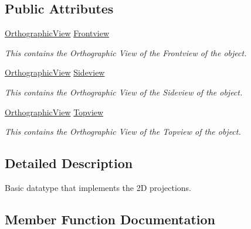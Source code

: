 \subsection*{Public Attributes}
\begin{DoxyCompactItemize}
\item 
\mbox{\label{class_file2_d_a3f1062d4c68eba7a225152bf63832d8b}} 
\mbox{\hyperlink{class_orthographic_view}{Orthographic\+View}} \mbox{\hyperlink{class_file2_d_a3f1062d4c68eba7a225152bf63832d8b}{Frontview}}
\begin{DoxyCompactList}\small\item\em This contains the Orthographic View of the Frontview of the object. \end{DoxyCompactList}\item 
\mbox{\label{class_file2_d_ad5bf89a1555c22903c084ec9692015d8}} 
\mbox{\hyperlink{class_orthographic_view}{Orthographic\+View}} \mbox{\hyperlink{class_file2_d_ad5bf89a1555c22903c084ec9692015d8}{Sideview}}
\begin{DoxyCompactList}\small\item\em This contains the Orthographic View of the Sideview of the object. \end{DoxyCompactList}\item 
\mbox{\label{class_file2_d_aa893807e0bfcd03ebc1c54607e961a65}} 
\mbox{\hyperlink{class_orthographic_view}{Orthographic\+View}} \mbox{\hyperlink{class_file2_d_aa893807e0bfcd03ebc1c54607e961a65}{Topview}}
\begin{DoxyCompactList}\small\item\em This contains the Orthographic View of the Topview of the object. \end{DoxyCompactList}\end{DoxyCompactItemize}


\subsection{Detailed Description}
Basic datatype that implements the 2D projections. 

\subsection{Member Function Documentation}
\mbox{\label{class_file2_d_a516073c61faccb01eb4e9312a9653274}} 
